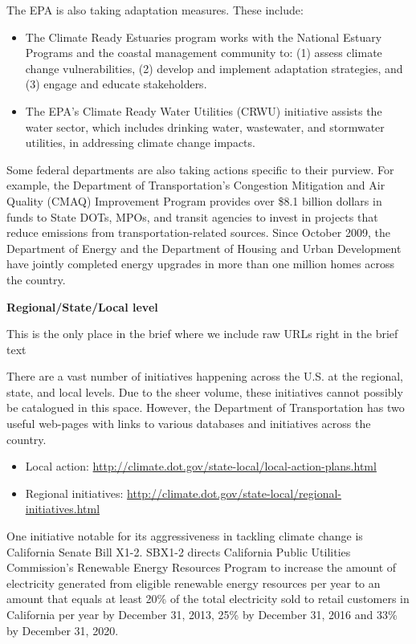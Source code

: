 The EPA is also taking adaptation measures. These include:	
\begin{itemize}
	\item The Climate Ready Estuaries program works with the National Estuary Programs and the coastal management community to: (1) assess climate change vulnerabilities, (2) develop and implement adaptation strategies, and (3) engage and educate stakeholders.
	\item The EPA's Climate Ready Water Utilities (CRWU) initiative assists the water sector, which includes drinking water, wastewater, and stormwater utilities, in addressing climate change impacts.
\end{itemize}
	
	

Some federal departments are also taking actions specific to their purview. For example, the Department of Transportation’s Congestion Mitigation and Air Quality (CMAQ) Improvement Program provides over \$8.1 billion dollars in funds to State DOTs, MPOs, and transit agencies to invest in projects that reduce emissions from transportation-related sources.  Since October 2009, the Department of Energy and the Department of Housing and Urban Development have jointly completed energy upgrades in more than one million homes across the country.



\textbf{Regional/State/Local level}

\begin{vcom}
	This is the only place in the brief where we include raw URLs right in the brief text
\end{vcom}

There are a vast number of initiatives happening across the U.S. at the regional, state, and local levels. Due to the sheer volume, these initiatives cannot possibly be catalogued in this space. However, the Department of Transportation has two useful web-pages with links to various databases and initiatives across the country.
\begin{itemize}
	\item Local action: \url{http://climate.dot.gov/state-local/local-action-plans.html}
	\item Regional initiatives: \url{http://climate.dot.gov/state-local/regional-initiatives.html}
\end{itemize}
One initiative notable for its aggressiveness in tackling climate change is California Senate Bill X1-2. SBX1-2 directs California Public Utilities Commission's Renewable Energy Resources Program to increase the amount of electricity generated from eligible renewable energy resources per year to an amount that equals at least 20\% of the total electricity sold to retail customers in California per year by December 31, 2013, 25\% by December 31, 2016 and 33\% by December 31, 2020.




